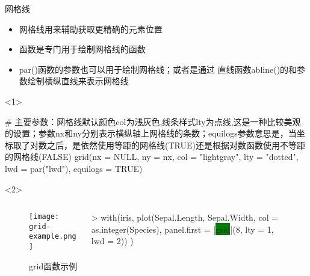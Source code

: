 \begin{frame}[t,fragile]{\subsecname}{网格线}
\begin{itemize}
\item 网格线用来辅助获取更精确的元素位置
\item {}函数是专门用于绘制网格线的函数
\item par()函数的参数也可以用于绘制网格线；或者是通过
直线函数abline()的和参数绘制横纵直线来表示网格线
\end{itemize}

\begin{onlyenv}<1>
\begin{rcode}
# 主要参数：网格线默认颜色col为浅灰色,线条样式lty为点线,这是一种比较美观的设置；参数nx和ny分别表示横纵轴上网格线的条数；equilogs参数意思是，当坐标取了对数之后，是依然使用等距的网格线(TRUE)还是根据对数函数使用不等距的网格线(FALSE)
grid(nx = NULL, ny = nx, col = "lightgray", lty = "dotted", lwd = par("lwd"), equilogs = TRUE)
\end{rcode}
\end{onlyenv} 

\begin{onlyenv}<2>
\begin{figure}
 \begin{columns}
    \begin{column}[c]{.4\textwidth}
        \texttt{[image: grid-example.png]}
    \end{column}

    \begin{column}[c]{.6\textwidth}
\begin{rcode}
> with(iris,
   {
   plot(Sepal.Length, Sepal.Width, col = as.integer(Species), panel.first = |\colorbox{green}{grid}|(8, lty = 1, lwd = 2))
   })
\end{rcode}
    \end{column}
  \end{columns}
  \caption{grid函数示例}
\end{figure}
\end{onlyenv} 
\end{frame} 

